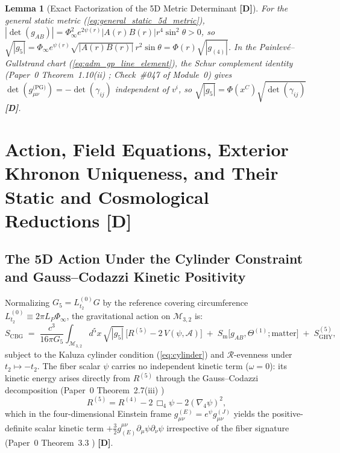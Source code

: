 \documentclass[11pt,a4paper]{article}
\newcommand{\catD}{\textbf{\textcolor{blue!75!black}{[D]}}}
\newtheorem{lemma}[theorem]{Lemma}
\theoremstyle{definition}
\theoremstyle{remark}
\begin{document}
\begin{lemma}[Exact Factorization of the 5D Metric Determinant \catD]
\label{lem:det_factor}
For the general static metric (\ref{eq:general_static_5d_metric}), $|\det(g_{AB})| = \Phi_{\infty}^2 e^{2\psi(r)} |A(r) B(r)| r^4\sin^2\theta > 0$, so $\sqrt{|g_5|} = \Phi_{\infty}e^{\psi(r)}\sqrt{|A(r)B(r)|}\,r^2\sin\theta = \Phi(r)\sqrt{|g_{(4)}|}$. In the Painlev\'e--Gullstrand chart (\ref{eq:adm_gp_line_element}), the Schur complement identity (Paper~0 Theorem~1.10(ii) \cite{JV_Paper0}; Check~\#047 of Module~0) gives $\det(g_{\mu\nu}^{\text{(PG)}}) = -\det(\gamma_{ij})$ independent of $v^i$, so $\sqrt{|g_5|} = \Phi(x^C)\sqrt{\det(\gamma_{ij})}$ \catD.
\end{lemma}

\section{\texorpdfstring{Action, Field Equations, Exterior Khronon Uniqueness, and Their Static and Cosmological Reductions \catD}{Action, Field Equations, Exterior Khronon Uniqueness, and Their Static and Cosmological Reductions}}
\label{sec:action}

\subsection{\texorpdfstring{The 5D Action Under the Cylinder Constraint and Gauss--Codazzi Kinetic Positivity}{The 5D Action Under the Cylinder Constraint and Gauss-Codazzi Kinetic Positivity}}

Normalizing $G_5 = L_{t_2}^{(0)} G$ by the reference covering circumference $L_{t_2}^{(0)} \equiv 2\pi L_P\Phi_{\infty}$, the gravitational action on $\mathcal{M}_{3,2}$ is:
\begin{equation}
  S_{\text{CBG}} \;=\; \frac{c^3}{16\pi G_5}\int_{\mathcal{M}_{3,2}} d^5x\,\sqrt{|g_5|}\,
  \Big[R^{(5)} - 2\,V(\psi, \mathcal{A})\Big] \;+\; S_{\text{m}}\big[g_{AB}, \Theta^{(1)}; \text{matter}\big] \;+\; S_{\text{GHY}}^{(5)},
  \label{eq:action}
\end{equation}
subject to the Kaluza cylinder condition (\ref{eq:cylinder}) and $\mathcal{R}$-evenness under $t_2 \mapsto -t_2$. The fiber scalar $\psi$ carries no independent kinetic term ($\omega = 0$): its kinetic energy arises directly from $R^{(5)}$ through the Gauss--Codazzi decomposition (Paper~0 Theorem~2.7(iii) \cite{JV_Paper0})
\begin{equation}
  R^{(5)} = R^{(4)} - 2\,\Box_4\psi - 2\left(\nabla_4\psi\right)^2,
  \label{eq:gauss_codazzi_R5}
\end{equation}
which in the four-dimensional Einstein frame $g_{\mu\nu}^{(E)} = e^{\psi}g_{\mu\nu}^{(J)}$ yields the positive-definite scalar kinetic term $+\frac{3}{2}g_{(E)}^{\mu\nu}\partial_{\mu}\psi\partial_{\nu}\psi$ irrespective of the fiber signature (Paper~0 Theorem~3.3 \cite{JV_Paper0}) \catD.
\end{document}
